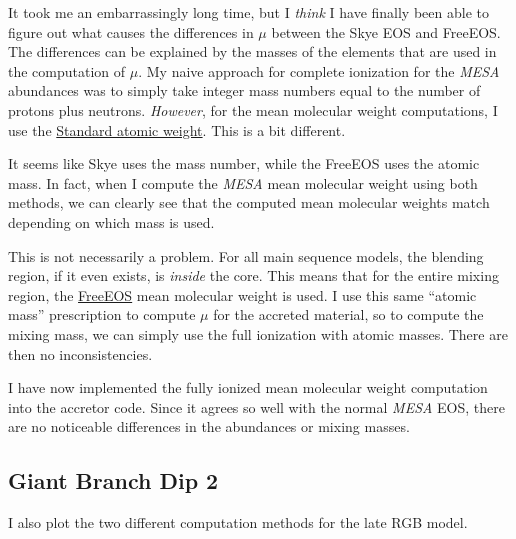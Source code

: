 \documentclass[a4paper,10pt]{article}
\begin{document}
It took me an embarrassingly long time, but I \emph{think} I have finally been able to figure out what causes the differences in \(\mu \) between the Skye EOS and FreeEOS.
The differences can be explained by the masses of the elements that are used in the computation of \(\mu \).
My naive approach for complete ionization for the
\emph{MESA} abundances was to simply take integer mass numbers equal to the number of protons plus neutrons.
\emph{However}, for the \citet{asplund2009} mean molecular weight
computations, I use the \href{https://en.wikipedia.org/wiki/Standard_atomic_weight#cite_note-23}{Standard atomic weight}.
This is a bit different.

It seems like Skye \citep{jermyn2021} uses the mass number, while the FreeEOS uses the atomic mass.
In fact, when I compute the \emph{MESA} mean molecular weight
using both methods, we can clearly see that the computed mean molecular weights match depending on which mass is used.

\begin{figure}[ht]
	\centering
\end{figure}

This is not necessarily a problem.
For all main sequence models, the blending region, if it even exists, is \emph{inside} the core.
This means that for the entire mixing region, the \href{https://freeeos.sourceforge.net}{FreeEOS} mean molecular weight is used.
I use this same ``atomic mass'' prescription to compute \(\mu \) for the accreted material, so to compute the
mixing mass, we can simply use the full ionization with atomic masses.
There are then no inconsistencies.

I have now implemented the fully ionized mean molecular weight computation into the accretor code.
Since it agrees so well with the normal \emph{MESA} EOS, there are no noticeable differences
in the abundances or mixing masses.

\subsection{Giant Branch Dip 2}
I also plot the two different computation methods for the late RGB model.
\begin{figure}[ht]
	\centering
\end{figure}
\end{document}
